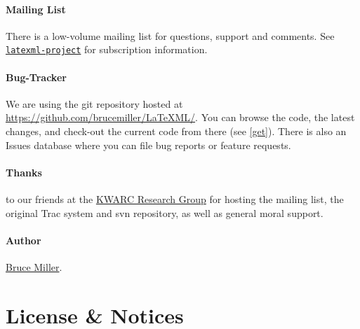 \documentclass{article}
\begin{document}
\paragraph{Mailing List}\label{contact.list}
There is a low-volume mailing list for questions, support and comments.
See \href{http://lists.kwarc.info/mailman/listinfo/project-latexml}{\texttt{latexml-project}} for subscription information.


\paragraph{Bug-Tracker}\label{contact.git}
We are using the git repository hosted at
\href{https://github.com/brucemiller/LaTeXML/}{https://github.com/brucemiller/LaTeXML/}.
You can browse the code, the latest changes, and check-out the current code from
there (see \ref{get}).  There is also an Issues database where you can
file bug reports or feature requests.



\paragraph{Thanks} to our friends at
the \href{http://kwarc.info}{KWARC Research Group}
for hosting the mailing list, the original Trac system and svn repository,
as well as general moral support.

\paragraph{Author} \href{mailto:bruce.miller@nist.gov}{Bruce Miller}.
\section{License \& Notices}\label{notices}
\end{document}
